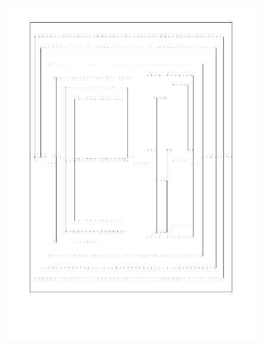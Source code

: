 \begin{figure}[htbp]
\centering
\includegraphics{figures/92_Appendix_Visual_Aids_Materials/shaded_card4.png}
\caption{}
\end{figure}

